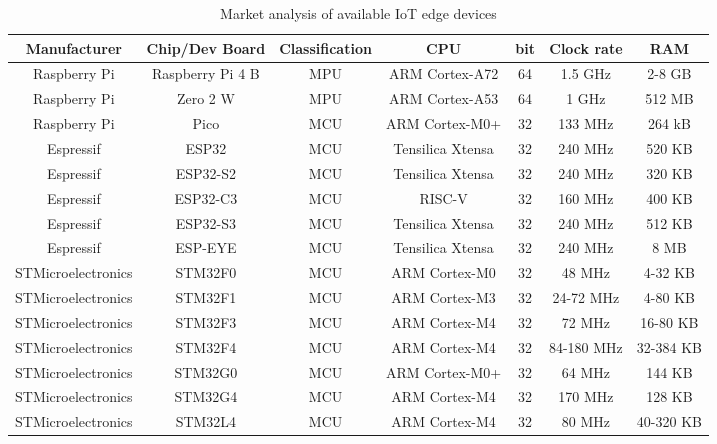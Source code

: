 \begin{sidewaystable}[]
	\centering
	\begin{tabular}{c|c|c|c|c|c|c}

	\textbf{Manufacturer} 	& \textbf{Chip/Dev Board} & \textbf{Classification} & \textbf{CPU} & \textbf{bit} & \textbf{Clock rate} & \textbf{RAM}\\
	\hline
	\hline
	Raspberry Pi          	& Raspberry Pi 4 B	& MPU  	& ARM Cortex-A72       	& 64    	& 1.5 GHz	& 2-8 GB\\ %
	Raspberry Pi          	& Zero 2 W          	& MPU   	& ARM Cortex-A53       	& 64     	& 1 GHz		& 512 MB\\ %
	Raspberry Pi          	& Pico           		& MCU   	& ARM Cortex-M0+      & 32 	& 133 MHz 	& 264 kB\\ %
	\hline
	Espressif             		& ESP32              	& MCU   	& Tensilica Xtensa   	& 32		& 240 MHz	& 520 KB\\  %
	Espressif             		& ESP32-S2    	& MCU   	& Tensilica Xtensa   	& 32		& 240 MHz	& 320 KB\\ %
	Espressif             		& ESP32-C3    	& MCU   	& RISC-V       		& 32		& 160 MHz	& 400 KB\\ %
	Espressif             		& ESP32-S3     	& MCU   	& Tensilica Xtensa   	& 32		& 240 MHz	& 512 KB\\ %
	Espressif             		& ESP-EYE     		& MCU   	& Tensilica Xtensa   	& 32		& 240 MHz	& 8 MB\\ %
	\hline
	STMicroelectronics  	& STM32F0     	& MCU   	& ARM Cortex-M0        	& 32		& 48 MHz	& 4-32 KB\\ %
	STMicroelectronics  	& STM32F1     	& MCU 	& ARM Cortex-M3        	& 32		& 24-72 MHz	& 4-80 KB\\ %
	STMicroelectronics  	& STM32F3       	& MCU  	& ARM Cortex-M4        	& 32		& 72 MHz	& 16-80 KB\\ %
	STMicroelectronics  	& STM32F4       	& MCU  	& ARM Cortex-M4        	& 32		& 84-180 MHz	& 32-384 KB\\ %
	STMicroelectronics  	& STM32G0        	& MCU  	& ARM Cortex-M0+     	& 32		& 64 MHz	& 144 KB\\ %
	STMicroelectronics  	& STM32G4       	& MCU   	& ARM Cortex-M4        	& 32		& 170 MHz	& 128 KB\\ %
	STMicroelectronics  	& STM32L4       	& MCU   	& ARM Cortex-M4        	& 32		& 80 MHz	& 40-320 KB\\ %
	
	\end{tabular}
	\caption{Market analysis of available IoT edge devices}
	\label{tab:market}
\end{sidewaystable}

